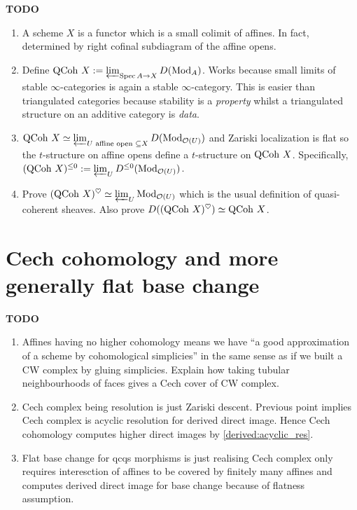 \documentclass{article}
\begin{document}
\textbf{TODO}
\begin{enumerate}
  \item A scheme $X$ is a functor which is a small colimit of affines.
  In fact, determined by right cofinal subdiagram of the affine opens.
  \item Define $\operatorname{QCoh}\,X := \varprojlim_{\operatorname{Spec} A \to X} D(\mathrm{Mod}_A)$.
  Works because small limits of stable $\infty$-categories is
  again a stable $\infty$-category.
  This is easier than triangulated categories 
  because stability is a \emph{property}
  whilst a triangulated structure on an additive category is \emph{data}.
  \item $\operatorname{QCoh}\,X \simeq \varprojlim_{U \text{ affine open }\subseteq X} D(\mathrm{Mod}_{\mathcal{O}(U)})$
  and Zariski localization is flat so the $t$-structure 
  on affine opens define a $t$-structure on $\operatorname{QCoh}\,X$.
  Specifically, $(\operatorname{QCoh}\,X)^{\leq 0} := \varprojlim_{U} D^{\leq 0}(\mathrm{Mod}_{\mathcal{O}(U)})$.
  \item Prove $(\operatorname{QCoh} \,X)^\heartsuit \simeq \varprojlim_{U} \mathrm{Mod}_{\mathcal{O}(U)}$
  which is the usual definition of quasi-coherent sheaves.
  Also prove $D((\operatorname{QCoh} \, X)^\heartsuit) \simeq \operatorname{QCoh}\, X$.
\end{enumerate}

\section{Cech cohomology and more generally flat base change}

\textbf{TODO}
\begin{enumerate}
  \item Affines having no higher cohomology
  means we have ``a good approximation of a scheme
  by cohomological simplicies'' in the same sense
  as if we built a CW complex by gluing simplicies.
  Explain how taking tubular neighbourhoods of faces gives
  a Cech cover of CW complex.
  \item Cech complex being resolution is just Zariski descent.
  Previous point implies Cech complex is
  acyclic resolution for derived direct image.
  Hence Cech cohomology computes higher direct images by 
  \ref{derived:acyclic_res}.
  \item Flat base change for qcqs morphisms is just realising
  Cech complex only requires interesction of affines to be 
  covered by finitely many affines and computes derived direct image
  for base change because of flatness assumption.
\end{enumerate}

\printbibliography
\end{document}
